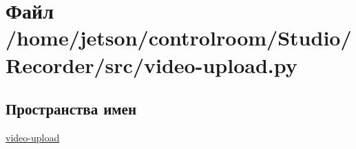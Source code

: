 \hypertarget{video-upload_8py}{}\section{Файл /home/jetson/controlroom/\+Studio/\+Recorder/src/video-\/upload.py}
\label{video-upload_8py}
\subsection*{Пространства имен}
\begin{DoxyCompactItemize}
\item 
 \hyperlink{namespacevideo-upload}{video-\/upload}
\end{DoxyCompactItemize}

